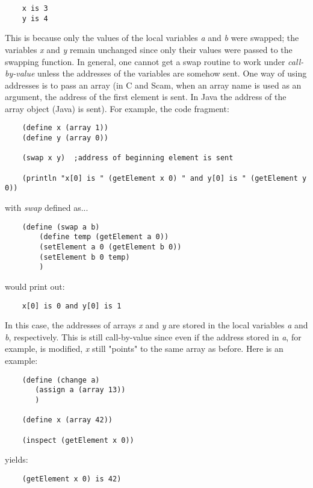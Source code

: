 \begin{verbatim}
    x is 3
    y is 4
\end{verbatim}

This is because only the values of the local variables {\it a} and {\it b}
were swapped; the variables {\it x} and {\it y} remain unchanged
since only their values were passed to the swapping function.
In
general, one cannot get a swap routine to work under {\it call-by-value}
unless the addresses of the variables are somehow sent. One way of
using addresses is to pass an array (in C and Scam, when an array name
is used as an argument, the address of the first element is sent. In Java
the address of the array
object (Java) is sent). For example,
the code fragment:

\begin{verbatim}
    (define x (array 1))
    (define y (array 0))

    (swap x y)  ;address of beginning element is sent

    (println "x[0] is " (getElement x 0) " and y[0] is " (getElement y 0))
\end{verbatim}

with {\it swap} defined as...

\begin{verbatim}
    (define (swap a b)
        (define temp (getElement a 0))
        (setElement a 0 (getElement b 0))
        (setElement b 0 temp)
        )
\end{verbatim}

would print out:

\begin{verbatim}
    x[0] is 0 and y[0] is 1
\end{verbatim}

In this case, the addresses of arrays {\it x} and {\it y}
are stored in the local variables {\it a} and
{\it b}, respectively.
This is
still call-by-value since even if the address stored in {\it a}, for example,
is modified,
{\it x} still "points" to the same array as before. Here is an example:

\begin{verbatim}
    (define (change a)
       (assign a (array 13))
       )

    (define x (array 42))

    (inspect (getElement x 0))
\end{verbatim}

yields:

\begin{verbatim}
    (getElement x 0) is 42)
\end{verbatim}

